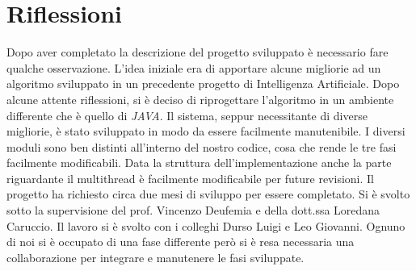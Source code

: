 \section{Riflessioni}
Dopo aver completato la descrizione del progetto sviluppato è necessario fare qualche osservazione.
L'idea iniziale era di apportare alcune migliorie ad un algoritmo sviluppato in un precedente progetto di Intelligenza Artificiale\cite{tesinaIA}. Dopo alcune attente riflessioni, si è deciso di riprogettare l'algoritmo in un ambiente differente che è quello di \emph{JAVA}.
Il sistema, seppur necessitante di diverse migliorie, è stato sviluppato in modo da essere facilmente manutenibile. I diversi moduli sono ben distinti all'interno del nostro codice, cosa che rende le tre fasi facilmente modificabili. Data la struttura dell'implementazione anche la parte riguardante il multithread è facilmente modificabile per future revisioni.
Il progetto ha richiesto circa due mesi di sviluppo per essere completato. Si è svolto sotto la supervisione del prof. Vincenzo Deufemia e della dott.ssa Loredana Caruccio. Il lavoro si è svolto con i colleghi Durso Luigi e Leo Giovanni. Ognuno di noi si è occupato di una fase differente però si è resa necessaria una collaborazione per integrare e manutenere le fasi sviluppate. 
